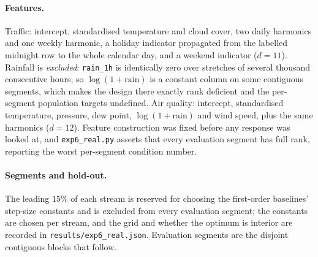 \paragraph{Features.} Traffic: intercept, standardised temperature and cloud cover, two daily
harmonics and one weekly harmonic, a holiday indicator propagated from the labelled midnight
row to the whole calendar day, and a weekend indicator ($d=11$). Rainfall is \emph{excluded}:
\texttt{rain\_1h} is identically zero over stretches of several thousand consecutive hours, so
$\log(1+\text{rain})$ is a constant column on some contiguous segments, which makes the design
there exactly rank deficient and the per-segment population targets undefined. Air quality:
intercept, standardised temperature, pressure, dew point, $\log(1+\text{rain})$ and wind
speed, plus the same harmonics ($d=12$). Feature construction was fixed before any response
was looked at, and \texttt{exp6\_real.py} asserts that every evaluation segment has full rank,
reporting the worst per-segment condition number.

\paragraph{Segments and hold-out.} The leading $15\%$ of each stream is reserved for choosing
the first-order baselines' step-size constants and is excluded from every evaluation segment;
the constants are chosen per stream, and the grid and whether the optimum is interior are
recorded in \texttt{results/exp6\_real.json}. Evaluation segments are the disjoint contiguous
blocks that follow.

